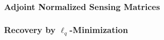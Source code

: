 \subsubsection{Adjoint Normalized Sensing Matrices}


\subsubsection{Recovery by $\ell_{q}$-Minimization}

